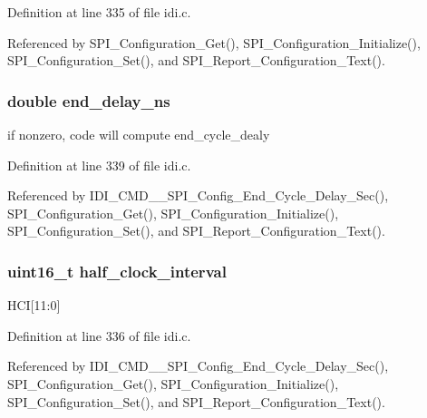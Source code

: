 Definition at line 335 of file idi.\+c.



Referenced by S\+P\+I\+\_\+\+Configuration\+\_\+\+Get(), S\+P\+I\+\_\+\+Configuration\+\_\+\+Initialize(), S\+P\+I\+\_\+\+Configuration\+\_\+\+Set(), and S\+P\+I\+\_\+\+Report\+\_\+\+Configuration\+\_\+\+Text().

\hypertarget{structspi__cfg_adc10d917ca7551b41164711a54684a51}{
\subsubsection[{end\+\_\+delay\+\_\+ns}]{\setlength{\rightskip}{0pt plus 5cm}double end\+\_\+delay\+\_\+ns}}\label{structspi__cfg_adc10d917ca7551b41164711a54684a51}
if nonzero, code will compute end\+\_\+cycle\+\_\+dealy 

Definition at line 339 of file idi.\+c.



Referenced by I\+D\+I\+\_\+\+C\+M\+D\+\_\+\+\_\+\+S\+P\+I\+\_\+\+Config\+\_\+\+End\+\_\+\+Cycle\+\_\+\+Delay\+\_\+\+Sec(), S\+P\+I\+\_\+\+Configuration\+\_\+\+Get(), S\+P\+I\+\_\+\+Configuration\+\_\+\+Initialize(), S\+P\+I\+\_\+\+Configuration\+\_\+\+Set(), and S\+P\+I\+\_\+\+Report\+\_\+\+Configuration\+\_\+\+Text().

\hypertarget{structspi__cfg_ad8d6adceadaec7f4c92349ec8beb720d}{
\subsubsection[{half\+\_\+clock\+\_\+interval}]{\setlength{\rightskip}{0pt plus 5cm}uint16\+\_\+t half\+\_\+clock\+\_\+interval}}\label{structspi__cfg_ad8d6adceadaec7f4c92349ec8beb720d}
H\+C\+I\mbox{[}11\+:0\mbox{]} 

Definition at line 336 of file idi.\+c.



Referenced by I\+D\+I\+\_\+\+C\+M\+D\+\_\+\+\_\+\+S\+P\+I\+\_\+\+Config\+\_\+\+End\+\_\+\+Cycle\+\_\+\+Delay\+\_\+\+Sec(), S\+P\+I\+\_\+\+Configuration\+\_\+\+Get(), S\+P\+I\+\_\+\+Configuration\+\_\+\+Initialize(), S\+P\+I\+\_\+\+Configuration\+\_\+\+Set(), and S\+P\+I\+\_\+\+Report\+\_\+\+Configuration\+\_\+\+Text().

